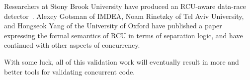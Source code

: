 Researchers at Stony Brook University have produced an RCU-aware data-race
detector~\cite{AbhinavDuggal2010Masters,JustinSeyster2012PhD,Seyster:2011:RFA:2075416.2075425}.
Alexey Gotsman of IMDEA, Noam Rinetzky of Tel Aviv University,
and Hongseok Yang of the University of Oxford have published a
paper~\cite{AlexeyGotsman2012VerifyGraceExtended} expressing the formal
semantics of RCU in terms of separation logic, and have continued with
other aspects of concurrency.

With some luck, all of this validation work will eventually result in
more and better tools for validating concurrent code.
